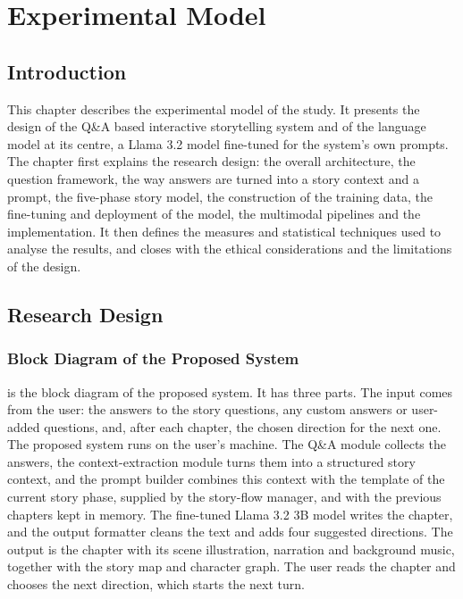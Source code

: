 \chapter{Experimental Model}
\label{ch:model}

\section{Introduction}
\label{sec:model-intro}

This chapter describes the experimental model of the study. It presents the design of the Q\&A based interactive storytelling system and of the language model at its centre, a Llama 3.2 model fine-tuned for the system's own prompts. The chapter first explains the research design: the overall architecture, the question framework, the way answers are turned into a story context and a prompt, the five-phase story model, the construction of the training data, the fine-tuning and deployment of the model, the multimodal pipelines and the implementation. It then defines the measures and statistical techniques used to analyse the results, and closes with the ethical considerations and the limitations of the design.

\section{Research Design}
\label{sec:model-design}

\subsection{Block Diagram of the Proposed System}
\label{sec:model-overall}

 is the block diagram of the proposed system. It has three parts. The input comes from the user: the answers to the story questions, any custom answers or user-added questions, and, after each chapter, the chosen direction for the next one. The proposed system runs on the user's machine. The Q\&A module collects the answers, the context-extraction module turns them into a structured story context, and the prompt builder combines this context with the template of the current story phase, supplied by the story-flow manager, and with the previous chapters kept in memory. The fine-tuned Llama 3.2 3B model writes the chapter, and the output formatter cleans the text and adds four suggested directions. The output is the chapter with its scene illustration, narration and background music, together with the story map and character graph. The user reads the chapter and chooses the next direction, which starts the next turn.

